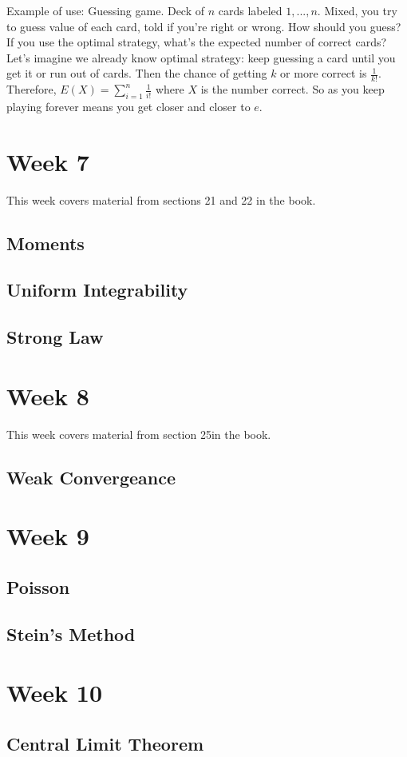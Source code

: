 \documentclass[12pt]{article}
\begin{document}
Example of use: Guessing game.  Deck of $n$ cards labeled $1, ..., n $.  Mixed, you try to guess value of each card, told if you're right or wrong.  How should you guess?  If you use the optimal strategy, what's the expected number of correct cards?  Let's imagine we already know optimal strategy: keep guessing a card until you get it or run out of cards.  Then the chance of getting $k$ or more correct is $\frac{1}{k!}$.  Therefore, $E(X) = \sum_{i=1}^n \frac{1}{i!}$ where $X$ is the number correct.  So as you keep playing forever means you get closer and closer to $e$.

\section{Week 7}
This week covers material from sections 21 and 22 in the book.

\subsection{Moments}

\subsection{Uniform Integrability}

\subsection{Strong Law}


\section{Week 8}
This week covers material from section 25in the book.

\subsection{Weak Convergeance}


\section{Week 9}

\subsection{Poisson}

\subsection{Stein's Method}


\section{Week 10}

\subsection{Central Limit Theorem}


\newpage
\begin{thebibliography}{99}

\end{thebibliography}
\end{document}
